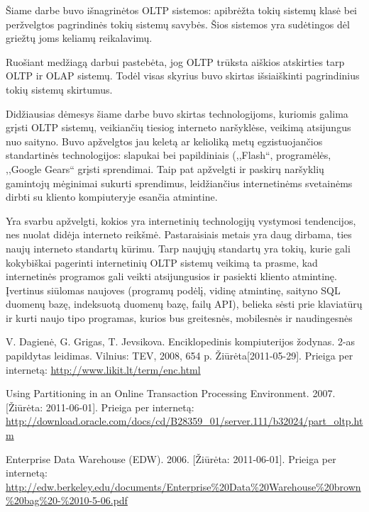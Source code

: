\documentclass[12pt,a4paper,titlepage]{article}
\begin{document}
Šiame darbe buvo išnagrinėtos OLTP sistemos: apibrėžta tokių sistemų klasė bei peržvelgtos pagrindinės tokių sistemų savybės. Šios sistemos yra sudėtingos dėl griežtų joms keliamų reikalavimų.

Ruošiant medžiagą darbui pastebėta, jog OLTP trūksta aiškios atskirties tarp OLTP ir OLAP sistemų. Todėl visas skyrius buvo skirtas išsiaiškinti pagrindinius tokių sistemų skirtumus.

Didžiausias dėmesys šiame darbe buvo skirtas technologijoms, kuriomis galima grįsti OLTP sistemų, veikiančių tiesiog interneto naršyklėse, veikimą atsijungus nuo saityno. Buvo apžvelgtos jau keletą ar kelioliką metų egzistuojančios standartinės technologijos: slapukai bei papildiniais (,,Flash``, programėlės, ,,Google Gears`` grįsti sprendimai. Taip pat apžvelgti ir paskirų naršyklių gamintojų mėginimai sukurti sprendimus, leidžiančius internetinėms svetainėms dirbti su kliento kompiuteryje esančia atmintine.

Yra svarbu apžvelgti, kokios yra internetinių technologijų vystymosi tendencijos, nes nuolat didėja interneto reikšmė. Pastaraisiais metais yra daug dirbama, ties naujų interneto standartų kūrimu. Tarp naujųjų standartų yra tokių, kurie gali kokybiškai pagerinti internetinių OLTP sistemų veikimą ta prasme, kad internetinės programos gali veikti atsijungusios ir pasiekti kliento atmintinę. Įvertinus siūlomas naujoves (programų podėlį, vidinę atmintinę, saityno SQL duomenų bazę, indeksuotą duomenų bazę, failų API), belieka sėsti prie klaviatūrų ir kurti naujo tipo programas, kurios bus greitesnės, mobilesnės ir naudingesnės


\begin{thebibliography}{99}
V. Dagienė, G. Grigas, T. Jevsikova. Enciklopedinis kompiuterijos žodynas. 2-as papildytas leidimas. Vilnius: TEV, 2008, 654 p. Žiūrėta[2011-05-29].  Prieiga per internetą: \url{http://www.likit.lt/term/enc.html}

Using Partitioning in an Online Transaction Processing Environment. 2007. [Žiūrėta: 2011-06-01]. Prieiga per internetą:   \url{http://download.oracle.com/docs/cd/B28359_01/server.111/b32024/part_oltp.htm}
 
Enterprise Data Warehouse (EDW). 2006. [Žiūrėta: 2011-06-01]. Prieiga per internetą:  \url{http://edw.berkeley.edu/documents/Enterprise%20Data%20Warehouse%20brown%20bag%20-%2010-5-06.pdf}

\end{thebibliography}
\end{document}
